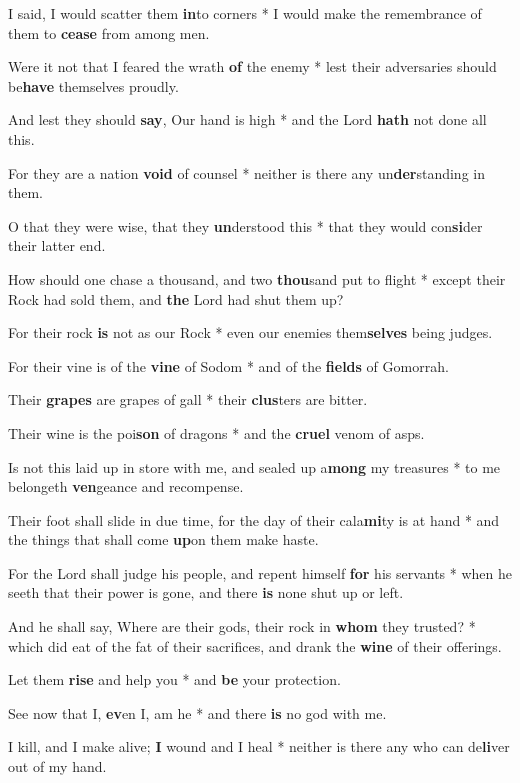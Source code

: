\begin{multicols}{2}
	I said, I would scatter them \textbf{in}to corners * I would make the remembrance of them to \textbf{cease} from among men.
	
	Were it not that I feared the wrath \textbf{of} the enemy * lest their adversaries should be\textbf{have} themselves proudly.
	
	And lest they should \textbf{say}, Our hand is high * and the Lord \textbf{hath} not done all this.
	
	For they are a nation \textbf{void} of counsel * neither is there any un\textbf{der}standing in them.
	
	O that they were wise, that they \textbf{un}derstood this * that they would con\textbf{si}der their latter end.
	
	How should one chase a thousand, and two \textbf{thou}sand put to flight * except their Rock had sold them, and \textbf{the} Lord had shut them up?
	
	For their rock \textbf{is} not as our Rock * even our enemies them\textbf{selves} being judges.
	
	For their vine is of the \textbf{vine} of Sodom * and of the \textbf{fields} of Gomorrah.
	
	Their \textbf{grapes} are grapes of gall * their \textbf{clus}ters are bitter.
	
	Their wine is the poi\textbf{son} of dragons * and the \textbf{cruel} venom of asps.
	
	Is not this laid up in store with me, and sealed up a\textbf{mong} my treasures *  to me belongeth \textbf{ven}geance and recompense.
	
	Their foot shall slide in due time, for the day of their cala\textbf{mi}ty is at hand * and the things that shall come \textbf{up}on them make haste.
	
	For the Lord shall judge his people, and repent himself \textbf{for} his servants * when he seeth that their power is gone, and there \textbf{is} none shut up or left.
	
	And he shall say, Where are their gods, their rock in \textbf{whom} they trusted? * which did eat of the fat of their sacrifices, and drank the \textbf{wine} of their offerings.
	
	Let them \textbf{rise} and help you * and \textbf{be} your protection.
	
	See now that I, \textbf{ev}en I, am he * and there \textbf{is} no god with me.
	
	I kill, and I make alive; \textbf{I} wound and I heal * neither is there any who can de\textbf{li}ver out of my hand.
	

\end{multicols}

